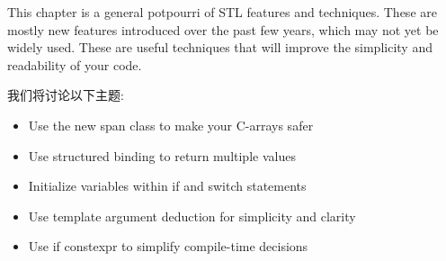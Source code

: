 
This chapter is a general potpourri of STL features and techniques. These are mostly new features introduced over the past few years, which may not yet be widely used. These are useful techniques that will improve the simplicity and readability of your code.

我们将讨论以下主题:

\begin{itemize}
\item 
Use the new span class to make your C-arrays safer

\item 
Use structured binding to return multiple values

\item 
Initialize variables within if and switch statements

\item 
Use template argument deduction for simplicity and clarity

\item 
Use if constexpr to simplify compile-time decisions
\end{itemize}

